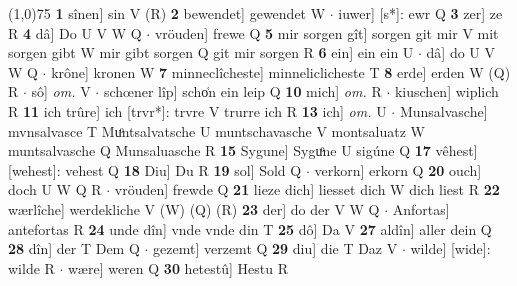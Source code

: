 \documentclass[8pt,a4paper,notitlepage]{article}
\begin{document}
\begin{table}[ht]
\begin{minipage}[t]{0.5\linewidth}
\line(1,0){75} \newline
\textbf{1} sînen] sin V (R) \textbf{2} bewendet] gewendet W  $\cdot$ iuwer] [s*]: ewr Q \textbf{3} zer] ze R \textbf{4} dâ] Do U V W Q  $\cdot$ vröuden] frewe Q \textbf{5} mir sorgen gît] sorgen git mir V mit sorgen gibt W mir gibt sorgen Q git mir sorgen R \textbf{6} ein] ein ein U  $\cdot$ dâ] do U V W Q  $\cdot$ krône] kronen W \textbf{7} minneclîcheste] minneliclicheste T \textbf{8} erde] erden W (Q) R  $\cdot$ sô] \textit{om.} V  $\cdot$ schœner lîp] scho͑n ein leip Q \textbf{10} mich] \textit{om.} R  $\cdot$ kiuschen] wiplich R \textbf{11} ich trûre] ich [trvr*]: trvre V trurre ich R \textbf{13} ich] \textit{om.} U  $\cdot$ Munsalvasche] mvnsalvasce T Muͦntsalvatsche U muntschavasche V montsaluatz W muntsalvasche Q Munsaluasche R \textbf{15} Sygune] Syguͦne U sigúne Q \textbf{17} vêhest] [wehest]: vehest Q \textbf{18} Diu] Du R \textbf{19} sol] Sold Q  $\cdot$ verkorn] erkorn Q \textbf{20} ouch] doch U W Q R  $\cdot$ vröuden] frewde Q \textbf{21} lieze dich] liesset dich W dich liest R \textbf{22} wærlîche] werdekliche V (W) (Q) (R) \textbf{23} der] do der V W Q  $\cdot$ Anfortas] antefortas R \textbf{24} unde dîn] vnde vnde din T \textbf{25} dô] Da V \textbf{27} aldîn] aller dein Q \textbf{28} dîn] der T Dem Q  $\cdot$ gezemt] verzemt Q \textbf{29} diu] die T Daz V  $\cdot$ wilde] [wide]: wilde R  $\cdot$ wære] weren Q \textbf{30} hetestû] Hestu R \newline
\end{minipage}
\end{table}
\end{document}
